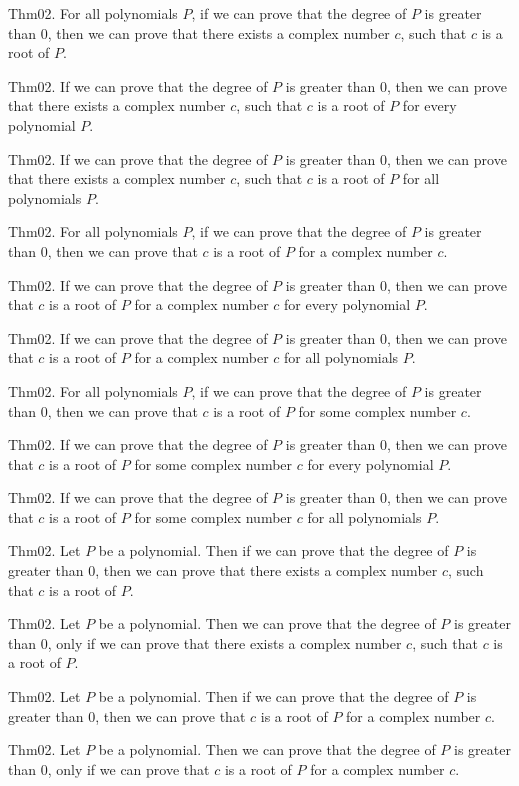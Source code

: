 \documentclass{article}
\begin{document}
Thm02. For all polynomials $P$, if we can prove that the degree of $P$ is greater than $0$, then we can prove that there exists a complex number $c$, such that $c$ is a root of $P$.

Thm02. If we can prove that the degree of $P$ is greater than $0$, then we can prove that there exists a complex number $c$, such that $c$ is a root of $P$ for every polynomial $P$.

Thm02. If we can prove that the degree of $P$ is greater than $0$, then we can prove that there exists a complex number $c$, such that $c$ is a root of $P$ for all polynomials $P$.

Thm02. For all polynomials $P$, if we can prove that the degree of $P$ is greater than $0$, then we can prove that $c$ is a root of $P$ for a complex number $c$.

Thm02. If we can prove that the degree of $P$ is greater than $0$, then we can prove that $c$ is a root of $P$ for a complex number $c$ for every polynomial $P$.

Thm02. If we can prove that the degree of $P$ is greater than $0$, then we can prove that $c$ is a root of $P$ for a complex number $c$ for all polynomials $P$.

Thm02. For all polynomials $P$, if we can prove that the degree of $P$ is greater than $0$, then we can prove that $c$ is a root of $P$ for some complex number $c$.

Thm02. If we can prove that the degree of $P$ is greater than $0$, then we can prove that $c$ is a root of $P$ for some complex number $c$ for every polynomial $P$.

Thm02. If we can prove that the degree of $P$ is greater than $0$, then we can prove that $c$ is a root of $P$ for some complex number $c$ for all polynomials $P$.

Thm02. Let $P$ be a polynomial. Then if we can prove that the degree of $P$ is greater than $0$, then we can prove that there exists a complex number $c$, such that $c$ is a root of $P$.

Thm02. Let $P$ be a polynomial. Then we can prove that the degree of $P$ is greater than $0$, only if we can prove that there exists a complex number $c$, such that $c$ is a root of $P$.

Thm02. Let $P$ be a polynomial. Then if we can prove that the degree of $P$ is greater than $0$, then we can prove that $c$ is a root of $P$ for a complex number $c$.

Thm02. Let $P$ be a polynomial. Then we can prove that the degree of $P$ is greater than $0$, only if we can prove that $c$ is a root of $P$ for a complex number $c$.
\end{document}
